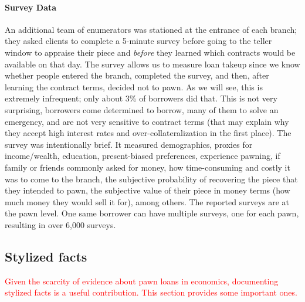 \documentclass[12pt, a4paper, colorinlistoftodos]{article}
\begin{document}
\paragraph*{Survey Data} An additional team of enumerators was stationed at the entrance of each branch; they asked clients to complete a 5-minute survey before going to the teller window to appraise their piece and \textit{before} they learned which contracts would be available on that day. The survey allows us to measure loan takeup since we know whether people entered the branch, completed the survey, and then, after learning the contract terms, decided not to pawn. As we will see, this is extremely infrequent; only about 3\% of borrowers did that. This is not very surprising, borrowers come determined to borrow, many of them to solve an emergency, and are not very sensitive to contract terms (that may explain why they accept high interest rates and over-collateralization in the first place). The survey was intentionally brief. It measured demographics, proxies for income/wealth, education, present-biased preferences, experience pawning, if family or friends commonly asked for money, how time-consuming and costly it was to come to the branch, the subjective probability of recovering the piece that they intended to pawn, the subjective value of their piece in money terms (how much money they would sell it for), among others. 
The reported surveys are at the pawn level. One same borrower can have multiple surveys, one for each pawn, resulting in over 6,000 surveys.  

\subsection{Stylized facts}


\textcolor{red}{Given the scarcity of evidence about pawn loans in economics,  documenting stylized facts is a useful contribution. This section provides some important ones.}
\end{document}
